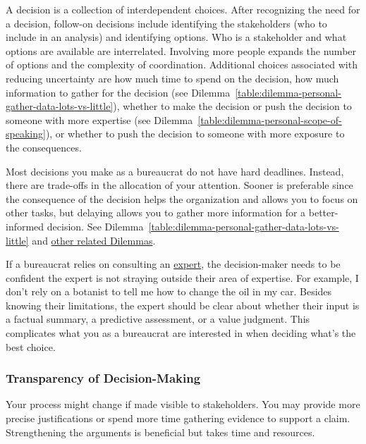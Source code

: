 A decision is a collection of interdependent choices. After recognizing the need for a decision, follow-on decisions include identifying the stakeholders (who to include in an analysis) and identifying options. Who is a stakeholder and what options are available are interrelated. Involving more people expands the number of options and the complexity of coordination. Additional choices associated with reducing uncertainty are how much time to spend on the decision, how much information to gather for the decision (see Dilemma~\ref{table:dilemma-personal-gather-data-lots-vs-little}),
whether to make the decision or push the decision to someone with more expertise (see Dilemma~\ref{table:dilemma-personal-scope-of-speaking}), or whether to push the decision to someone with more exposure to the consequences.

Most decisions you make as a bureaucrat do not have hard deadlines. Instead, there are trade-offs in the allocation of your attention. Sooner is preferable since the consequence of the decision helps the organization and allows you to focus on other tasks, but delaying allows you to gather more information for a better-informed decision. See 
Dilemma~\ref{table:dilemma-personal-gather-data-lots-vs-little}
and \hyperref[sec:dilemma-trilemma]{other related Dilemmas}.


If a bureaucrat relies on consulting an
\hyperref[sec:expertise]{expert},
the decision-maker needs to be confident the expert is not  straying outside their area of expertise. For example, I don't rely on a botanist  to tell me how to change the oil in my car. 
Besides knowing their limitations, the expert should be clear about whether their input is a factual summary, a predictive assessment, or a value judgment. This complicates what you as a bureaucrat are interested in when deciding what's the best choice.


\subsubsection*{Transparency of Decision-Making\label{sec:transparency-of-decisions}}

Your %
process might change if made visible to stakeholders. You may provide more precise justifications or spend more time gathering evidence to support a claim. Strengthening the arguments is beneficial but takes time and resources. 

